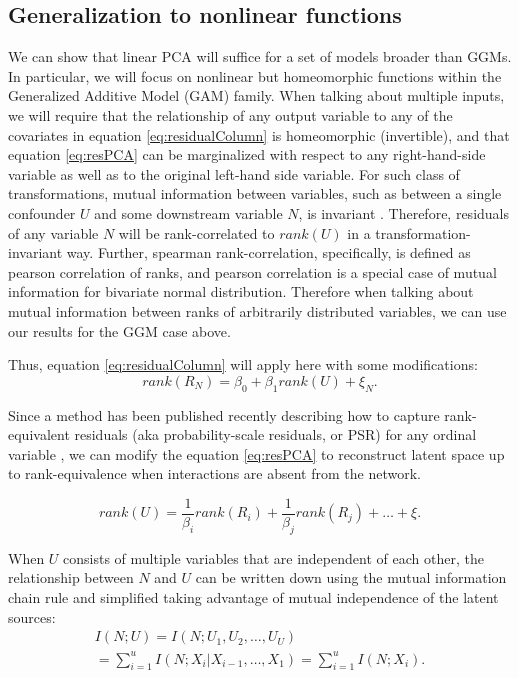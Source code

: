 \documentclass[letterpaper]{article}
\begin{document}
\subsection{Generalization to nonlinear functions}
We can show that linear PCA will suffice for a set of models broader than GGMs.  In particular, we will focus on nonlinear but homeomorphic functions within the Generalized Additive Model (GAM) family.  When talking about multiple inputs, we will require that the relationship of any output variable to any of the covariates in equation \ref{eq:residualColumn} is homeomorphic (invertible), and that equation \ref{eq:resPCA} can be marginalized with respect to any right-hand-side variable as well as to the original left-hand side variable.  For such class of transformations, mutual information between variables, such as between a single confounder $U$ and some downstream variable $N$, is invariant \cite{kraskov_estimating_2004}.  Therefore, residuals of any variable $N$ will be rank-correlated to $rank(U)$ in a transformation-invariant way. Further, spearman rank-correlation, specifically, is defined as pearson correlation of ranks, and pearson correlation is a special case of mutual information for bivariate normal distribution.  Therefore when talking about mutual information between ranks of arbitrarily distributed variables, we can use our results for the GGM case above.

Thus, equation \ref{eq:residualColumn} will apply here with some modifications:
\begin{equation}
rank(R_N) = \beta_0 + \beta_1 rank(U) + \xi_N.
\label{eq:residualColumnRank}
\end{equation}

Since a method has been published recently describing how to capture rank-equivalent residuals (aka probability-scale residuals, or PSR) for any ordinal variable \cite{shepherd_probability-scale_2016}, we can modify the equation \ref{eq:resPCA} to reconstruct latent space up to rank-equivalence when interactions are absent from the network.

\begin{equation}
rank(U) = \frac{1}{\beta_i} rank(R_i) + \frac{1}{\beta_j} rank(R_j) + \dots + \xi. 
\label{resPcaGam}
\end{equation}

When $U$ consists of multiple variables that are independent of each other, the relationship between $N$ and $U$ can be written down using the mutual information chain rule \cite{mackay_information_2003} and simplified taking advantage of mutual independence of the latent sources:
\begin{equation}
\label{eq:rankSetRelationship}
\begin{split}
I(N; U) = I(N; U_1, U_2, \dots, U_U) \\= \sum_{i=1}^{u}{I(N; X_i | X_{i-1}, \dots, X_1)} = \sum_{i=1}^{u}{I(N; X_i)}.
\end{split}
\end{equation}
\end{document}
